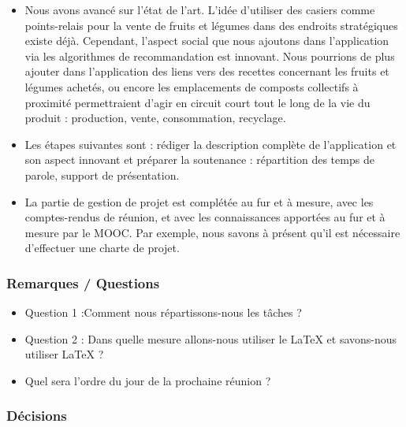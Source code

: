 \documentclass[11pt]{article}
\begin{document}
\begin{itemize}
	\item 	Nous avons avancé sur l’état de l’art. L’idée d’utiliser des casiers comme points-relais pour la vente de fruits et légumes dans des endroits stratégiques existe déjà. Cependant, l’aspect social que nous ajoutons dans l’application via les algorithmes de recommandation est innovant. Nous pourrions de plus ajouter dans l’application des liens vers des recettes concernant les fruits et légumes achetés, ou encore les emplacements de composts collectifs à proximité permettraient d’agir en circuit court tout le long de la vie du produit : production, vente, consommation, recyclage.
	\item 	Les étapes suivantes sont : rédiger la description complète de l’application et son aspect innovant et préparer la soutenance : répartition des temps de parole, support de présentation.
	\item La partie de gestion de projet est complétée au fur et à mesure, avec les comptes-rendus de réunion, et avec les connaissances apportées au fur et à mesure par le MOOC. Par exemple, nous savons à présent qu’il est nécessaire d’effectuer une charte de projet.
\end{itemize}

\vspace{0.5cm}

\subsubsection{Remarques / Questions}
\vspace{0.2cm}

\begin{itemize}
	\item Question 1 :Comment nous répartissons-nous les tâches ?	
	\item Question 2 : Dans quelle mesure allons-nous utiliser le LaTeX et savons-nous utiliser LaTeX ?
	\item Quel sera l’ordre du jour de la prochaine réunion ?

\end{itemize}

\vspace{0.5cm}
\subsubsection{Décisions} 
\vspace{0.2cm}
\end{document}
